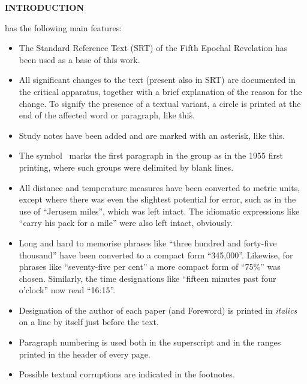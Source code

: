 \newpage
\thispagestyle{empty}

\makeatletter
{}%
\makeatother

\begin{center}
\LARGE{}\bfseries
INTRODUCTION
\end{center}


 has the following main features:

\begin{itemize}
\item The Standard Reference Text (SRT) of the Fifth Epochal Revelation has been used as a base of this work.
\item All significant changes to the text (present also in SRT) are documented in the critical apparatus, together with a brief explanation of the reason for the change. To signify the presence of a textual variant, a circle is printed at the end of the affected word or paragraph, like this\r{}.
\item Study notes have been added and are marked with an asterisk, like this\ts{*}.
\item The symbol \pc\ marks the first paragraph in the group as in the 1955 first printing, where such groups were delimited by blank lines.
\item All distance and temperature measures have been converted to metric units, except where there was even the slightest potential for error, such as in the use of ``Jerusem miles'', which was left intact. The idiomatic expressions like ``carry his pack for a mile'' were also left intact, obviously.
\item Long and hard to memorise phrases like ``three hundred and forty\hyp{}five thousand'' have been converted to a compact form ``345,000''. Likewise, for phrases like ``seventy\hyp{}five per cent'' a more compact form of ``75\%'' was chosen. Similarly, the time designations like ``fifteen minutes past four o’clock'' now read ``16:15''.
\item Designation of the author of each paper (and Foreword) is printed in \textit{italics} on a line by itself just before the text.
\item Paragraph numbering is used both in the superscript and in the ranges printed in the head\-er of every page.
\item Possible textual corruptions are indicated in the footnotes.
\end{itemize}


